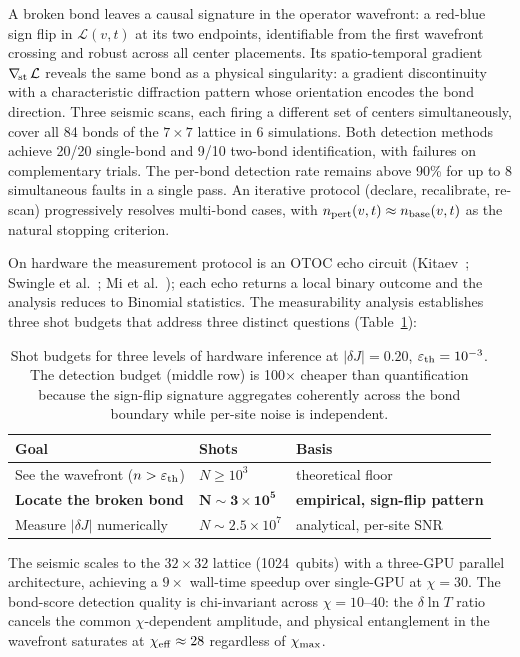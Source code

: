 \documentclass[11pt]{article}
\begin{document}
A broken bond leaves a causal signature in the operator wavefront: a
red-blue sign flip in $\mathcal{L}(v,t)$ at its two endpoints, identifiable
from the first wavefront crossing and robust across all center placements.
Its spatio-temporal gradient $\nabla_{\!\rm st}\,\mathcal{L}$ reveals the same
bond as a physical singularity: a gradient discontinuity with a characteristic
diffraction pattern whose orientation encodes the bond direction.
Three seismic scans, each firing a different set of centers simultaneously,
cover all 84 bonds of the $7\times7$ lattice in 6 simulations. Both detection
methods achieve 20/20 single-bond and 9/10 two-bond identification, with
failures on complementary trials. The per-bond detection rate remains above
90\% for up to 8 simultaneous faults in a single pass. An iterative protocol
(declare, recalibrate, re-scan) progressively resolves multi-bond cases,
with $n_{\rm pert}(v,t) \approx n_{\rm base}(v,t)$ as the natural stopping criterion.

On hardware the measurement protocol is an OTOC echo circuit
(Kitaev~\cite{Kitaev2015Hidden}; Swingle et al.~\cite{Swingle2016Measuring};
Mi et al.~\cite{Mi2021Information}); each echo returns a local binary
outcome and the analysis reduces to Binomial statistics.
The measurability analysis establishes three shot budgets that address
three distinct questions (Table~\ref{tab:shot_budgets}):

\begin{table}[H]
\centering
\small
\begin{tabular}{lll}
\toprule
Goal & Shots & Basis \\
\midrule
See the wavefront ($n > \varepsilon_{\rm th}$) & $N \geq 10^3$ & theoretical floor \\
\textbf{Locate the broken bond} & $\mathbf{N \sim 3\times10^5}$ & \textbf{empirical, sign-flip pattern} \\
Measure $|\delta J|$ numerically & $N \sim 2.5\times10^7$ & analytical, per-site SNR \\
\bottomrule
\end{tabular}
\caption{Shot budgets for three levels of hardware inference at
$|\delta J|=0.20$, $\varepsilon_{\rm th}=10^{-3}$.
The detection budget (middle row) is 100$\times$ cheaper than
quantification because the sign-flip signature aggregates coherently
across the bond boundary while per-site noise is independent.}
\label{tab:shot_budgets}
\end{table}

The seismic scales to the $32\times32$ lattice (1024~qubits) with a three-GPU
parallel architecture, achieving a $9\times$ wall-time speedup over single-GPU
at $\chi=30$. The bond-score detection quality is chi-invariant across
$\chi=10$--$40$: the $\delta\!\ln T$ ratio cancels the common $\chi$-dependent
amplitude, and physical entanglement in the wavefront saturates at
$\chi_{\rm eff}\approx 28$ regardless of $\chi_{\rm max}$.
\end{document}
